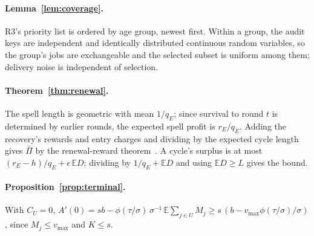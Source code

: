 \documentclass[11pt]{article}
\begin{document}
\paragraph{Lemma~\ref{lem:coverage}.} R3's priority list is ordered by age group, newest first. Within a group, the audit keys are independent and identically distributed continuous random variables, so the group's jobs are exchangeable and the selected subset is uniform among them; delivery noise is independent of selection.

\paragraph{Theorem~\ref{thm:renewal}.} The spell length is geometric with mean $1/q_E$; since survival to round $t$ is determined by earlier rounds, the expected spell profit is $r_E/q_E$. Adding the recovery's rewards and entry charges and dividing by the expected cycle length gives $\bar\Pi$ by the renewal-reward theorem~\cite{vlasiou2014renewal}. A cycle's surplus is at most $(r_E - h)/q_E + \epsilon\,\mathbb{E}D$; dividing by $1/q_E + \mathbb{E}D$ and using $\mathbb{E}D \ge L$ gives the bound.

\paragraph{Proposition~\ref{prop:terminal}.} With $C_U = 0$, $A'(0) = s b - \phi(\tau/\sigma)\,\sigma^{-1}\,\mathbb{E}\sum_{j \in U} M_j \ge s\,(b - v_{\max}\phi(\tau/\sigma)/\sigma)$, since $M_j \le v_{\max}$ and $K \le s$.



\end{document}
